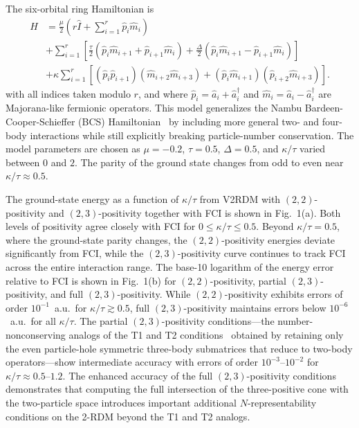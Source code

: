 \documentclass[aps,prl,floatfix,twocolumn,showpacs,10pt]{revtex4-2}
\begin{document}
The six-orbital ring Hamiltonian is
\begin{align}
\hat H &=
\frac{\mu}{2}
\left( r \hat I + \sum_{i=1}^{r} \hat p_i \hat m_i \right)
\label{eq:H1}
\\
&
+ \sum_{i=1}^{r}
\left[
\frac{\tau}{2}
  (\hat p_i \hat m_{i+1} + \hat p_{i+1} \hat m_i )
+
\frac{\Delta}{2}
  (\hat p_i \hat m_{i+1} - \hat p_{i+1} \hat m_i )
\right]
\nonumber
\\
&
+ \kappa \sum_{i=1}^{r}
\left[
(\hat p_i \hat p_{i+1})(\hat m_{i+2}\hat m_{i+3})
+
(\hat p_i \hat m_{i+1})(\hat p_{i+2}\hat m_{i+3})
\right].
\nonumber
\end{align}
with all indices taken modulo $r$, and where $\hat p_i = \hat a^{}_i + \hat a_i^\dagger$ and $\hat m_i = \hat a^{}_i - \hat a_i^\dagger$ are Majorana-like fermionic operators.  This model generalizes the Nambu Bardeen-Cooper-Schieffer (BCS) Hamiltonian~\cite{Bardeen.1957,Nambu.1960} by including more general two- and four-body interactions while still explicitly breaking particle-number conservation.  The model parameters are chosen as $\mu=-0.2$, $\tau=0.5$, $\Delta=0.5$, and $\kappa/\tau$ varied between $0$ and $2$.  The parity of the ground state changes from odd to even near $\kappa/\tau \approx 0.5$.

The ground-state energy as a function of $\kappa/\tau$ from V2RDM with $(2,2)$-positivity and $(2,3)$-positivity together with FCI is shown in Fig.~1(a).  Both levels of positivity agree closely with FCI for $0 \le \kappa/\tau \le 0.5$.  Beyond $\kappa/\tau = 0.5$, where the ground-state parity changes, the $(2,2)$-positivity energies deviate significantly from FCI, while the $(2,3)$-positivity curve continues to track FCI across the entire interaction range.  The base-10 logarithm of the energy error relative to FCI is shown in Fig.~1(b) for $(2,2)$-positivity, partial $(2,3)$-positivity, and full $(2,3)$-positivity. While $(2,2)$-positivity exhibits errors of order $10^{-1}$~a.u.\ for $\kappa/\tau \gtrsim 0.5$, full $(2,3)$-positivity maintains errors below $10^{-6}$~a.u.\ for all $\kappa/\tau$.  The partial $(2,3)$-positivity conditions---the number-nonconserving analogs of the T1 and T2 conditions~\cite{Zhao2004, Mazziotti2005, Mazziotti2016, Mazziotti2020, Erdahl1978} obtained by retaining only the even particle-hole symmetric three-body submatrices that reduce to two-body operators---show intermediate accuracy with errors of order $10^{-3}$–$10^{-2}$ for $\kappa/\tau \approx 0.5$–$1.2$.  The enhanced accuracy of the full $(2,3)$-positivity conditions demonstrates that computing the full intersection of the three-positive cone with the two-particle space introduces important additional $N$-representability conditions on the 2-RDM beyond the T1 and T2 analogs.
\end{document}
